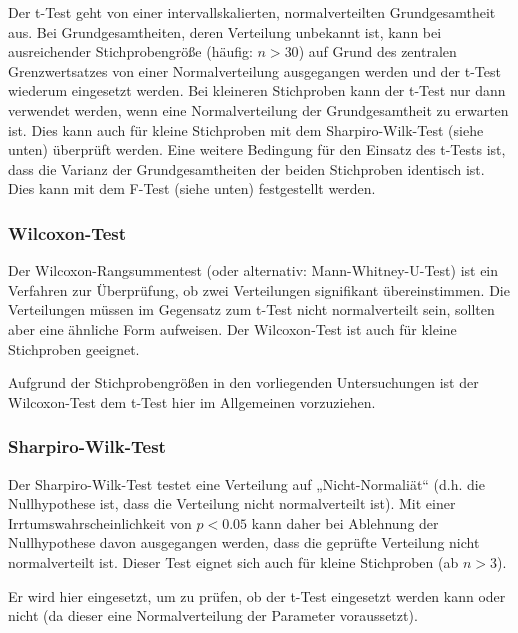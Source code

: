 Der t-Test geht von einer intervallskalierten, normalverteilten Grundgesamtheit aus. Bei Grundgesamtheiten, deren Verteilung unbekannt ist, kann bei ausreichender Stichprobengröße (häufig: $n>30$) auf Grund des zentralen Grenzwertsatzes von einer Normalverteilung ausgegangen werden und der t-Test wiederum eingesetzt werden. Bei kleineren Stichproben kann der t-Test nur dann verwendet werden, wenn eine Normalverteilung der Grundgesamtheit zu erwarten ist. Dies kann auch für kleine Stichproben mit dem Sharpiro-Wilk-Test (siehe unten) überprüft werden. Eine weitere Bedingung für den Einsatz des t-Tests ist, dass die Varianz der Grundgesamtheiten der beiden Stichproben identisch ist. Dies kann mit dem F-Test (siehe unten) festgestellt werden.  \citet{Bortz03}


\subsubsection{Wilcoxon-Test} %
\label{ssub:wilcoxon_text}
Der Wilcoxon-Rangsummentest (oder alternativ: Mann-Whitney-U-Test) ist ein Verfahren zur Überprüfung, ob zwei Verteilungen signifikant übereinstimmen. Die Verteilungen müssen im Gegensatz zum t-Test nicht normalverteilt sein, sollten aber eine ähnliche Form aufweisen. Der Wilcoxon-Test ist auch für kleine Stichproben geeignet. \citep{Duller08}

Aufgrund der Stichprobengrößen in den vorliegenden Untersuchungen ist der Wilcoxon-Test dem t-Test hier im Allgemeinen vorzuziehen. 


\subsubsection{Sharpiro-Wilk-Test} %
\label{ssub:sharpiro_wilk_test}

Der Sharpiro-Wilk-Test \citep{Shapiro65} testet eine Verteilung auf „Nicht-Normaliät“ (d.h. die Nullhypothese ist, dass die Verteilung nicht normalverteilt ist). Mit einer Irrtumswahrscheinlichkeit von $p<0.05$ kann daher bei Ablehnung der Nullhypothese davon ausgegangen werden, dass die geprüfte Verteilung nicht normalverteilt ist. Dieser Test eignet sich auch für kleine Stichproben (ab $n>3$). \citep{Duller08}

Er wird hier eingesetzt, um zu prüfen, ob der t-Test eingesetzt werden kann oder nicht (da dieser eine Normalverteilung der Parameter voraussetzt).

